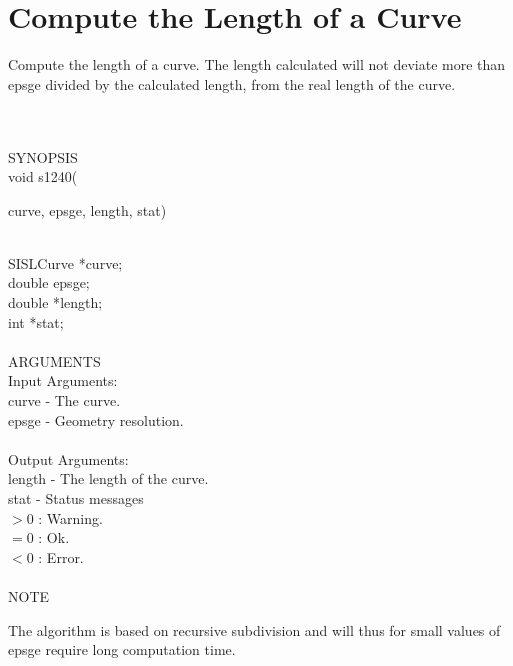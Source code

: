 \section{Compute the Length of a Curve}
\begin{minipg1}
  Compute the length of a curve. The length calculated will not deviate
  more than {\fov epsge} divided by the calculated length, from the real
  length of the curve.
\end{minipg1} \\ \\
SYNOPSIS\\
        \>void s1240(\begin{minipg3}
        {\fov curve}, {\fov epsge}, {\fov length}, {\fov stat})
                \end{minipg3}\\[0.3ex]
                \>\>    SISLCurve       \>      *{\fov curve};\\
                \>\>    double  \>      {\fov epsge};\\
                \>\>    double  \>      *{\fov length};\\
                \>\>    int     \>      *{\fov stat};\\
\\
ARGUMENTS\\
        \>Input Arguments:\\
        \>\>    {\fov curve}    \> - \> The curve.\\
        \>\>    {\fov epsge}    \> - \> Geometry resolution.\\
\\
        \>Output Arguments:\\
        \>\>    {\fov length}   \> - \> The length of the curve.\\
        \>\>    {\fov stat}     \> - \> Status messages\\
                \>\>\>\>\>              $> 0$   : Warning.\\
                \>\>\>\>\>              $= 0$   : Ok.\\
                \>\>\>\>\>              $< 0$   : Error.\\
\\
NOTE\\
\>\begin{minipg6}
        The algorithm is based on recursive
        subdivision and will thus for small values
        of {\fov epsge} require long computation time.
\end{minipg6} \\ \\
